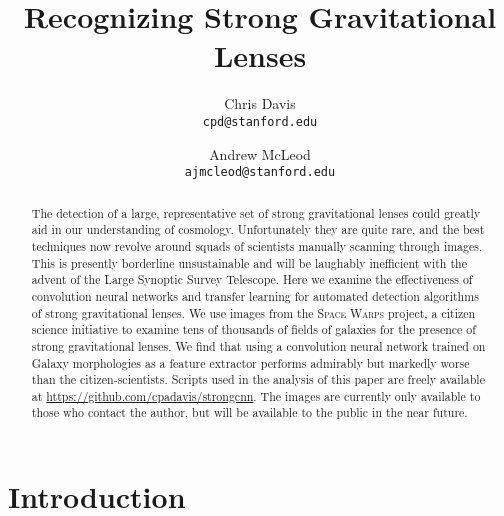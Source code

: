 \documentclass[10pt,twocolumn,letterpaper]{article}
\begin{document}
\title{Recognizing Strong Gravitational Lenses}

\author{Chris Davis\\
{\tt\small cpd@stanford.edu}
\and
Andrew McLeod\\
{\tt\small ajmcleod@stanford.edu}
}

\maketitle

\begin{abstract}
    The detection of a large, representative set of strong gravitational lenses
    could greatly aid in our understanding of cosmology. Unfortunately they are
    quite rare, and the best techniques now revolve around squads of scientists
    manually scanning through images. This is presently borderline
    unsustainable and will be laughably inefficient with the advent of the
    Large Synoptic Survey Telescope. Here we examine the effectiveness of
    convolution neural networks and transfer learning for automated detection
    algorithms of strong gravitational lenses. We use images from the
    \textsc{Space Warps} project, a citizen science initiative to examine tens
    of thousands of fields of galaxies for the presence of strong gravitational
    lenses. 
    We find that using a convolution neural network trained on Galaxy
    morphologies as a feature extractor performs admirably but markedly worse
    than the citizen-scientists.
    Scripts used in the analysis of this paper are freely available at
    \url{https://github.com/cpadavis/strongcnn}. The images are currently only
    available to those who contact the author, but will be available to the
    public in the near future.
\end{abstract}

\section{Introduction}
\end{document}
